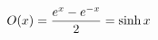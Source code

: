 \documentclass[preview]{standalone}
\begin{document}
\begin{align*}
\special{dvisvgm:raw <g id='unique000'>}O(x)=\frac{e^x-e^{-x}}{2}=\sinh x\special{dvisvgm:raw </g>}
\end{align*}
\end{document}
